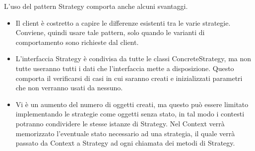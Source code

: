 		L'uso del pattern Strategy comporta anche alcuni svantaggi. 
		\begin{itemize}
			\item Il client è costretto a capire le differenze esistenti tra le varie strategie. Conviene, quindi usare tale pattern, solo quando le varianti di comportamento sono richieste dal client.
			\item L'interfaccia Strategy è condivisa da tutte le classi ConcreteStrategy, ma non tutte useranno tutti i dati che l'interfaccia mette a disposizione. Questo comporta il verificarsi di casi in cui saranno creati e inizializzati parametri che non verranno usati da nessuno.
			\item Vi è un aumento del numero di oggetti creati, ma questo può essere limitato implementando le strategie come oggetti senza stato, in tal modo i contesti potranno condividere le stesse istanze di Strategy. Nel Context verrà memorizzato l'eventuale stato necessario ad una strategia, il quale verrà passato da Context a Strategy ad ogni chiamata dei metodi di Strategy.
		\end{itemize}

